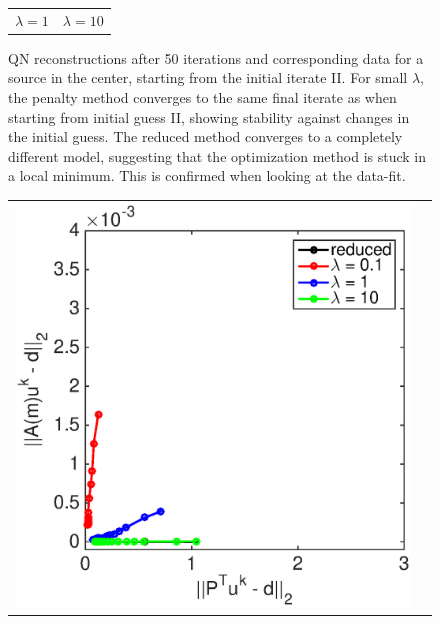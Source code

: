 \documentclass{iopart}
\begin{document}
\begin{figure}
\begin{tabular}{cc}
{\small $\lambda=1$}&
{\small $\lambda=10$}\\
\end{tabular}
\caption{QN reconstructions after 50 iterations and corresponding data for a source in the center, starting from the initial iterate II. For small $\lambda$, the penalty method converges to the same final iterate as when starting from initial guess II, showing stability against changes in the initial guess. The reduced method converges to a completely different model, suggesting that the optimization method is stuck in a local minimum. This is confirmed when looking at the data-fit.}
\label{fig:2D_overthrust2}
\end{figure}

\begin{figure}
\centering
\begin{tabular}{cc}
\includegraphics[scale=.3]{./figs/2D_overthrust1_e}&

\end{tabular}
\end{figure}
\end{document}
